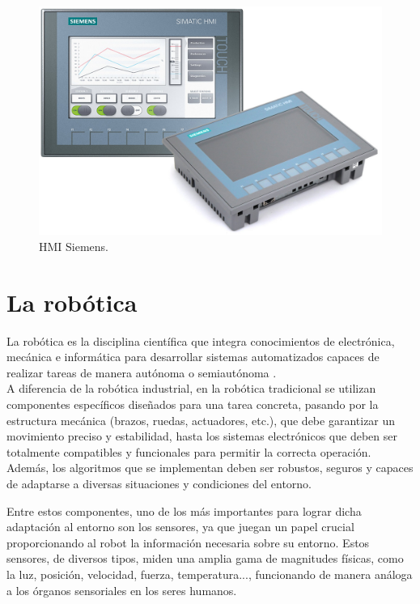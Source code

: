\begin{figure} [h!]
  \begin{center}
    \includegraphics[width=13cm]{figs/HMI}
  \end{center}
  \caption{\centering HMI Siemens.}
  \label{fig:HMI}
\end{figure} 

\section{La robótica}
\label{sec:segundaseccion} %

La robótica es la disciplina científica que integra conocimientos de electrónica, mecánica e informática para desarrollar sistemas automatizados capaces de realizar tareas de manera autónoma o semiautónoma \cite{definicion_robot}. \\

A diferencia de la robótica industrial, en la robótica tradicional se utilizan componentes específicos diseñados para una tarea concreta, pasando por la estructura mecánica (brazos, ruedas, actuadores, etc.), que debe garantizar un movimiento preciso y estabilidad, hasta los sistemas electrónicos que deben ser totalmente compatibles y funcionales para permitir la correcta operación. Además, los algoritmos que se implementan deben ser robustos, seguros y capaces de adaptarse a diversas situaciones y condiciones del entorno.

Entre estos componentes, uno de los más importantes para lograr dicha adaptación al entorno son los sensores, ya que juegan un papel crucial proporcionando al robot la información necesaria sobre su entorno. Estos sensores, de diversos tipos, miden una amplia gama de magnitudes físicas, como la luz, posición, velocidad, fuerza, temperatura..., funcionando de manera análoga a los órganos sensoriales en los seres humanos. 

